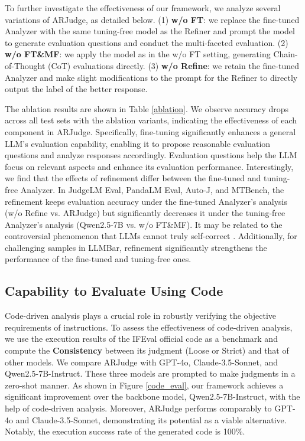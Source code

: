 To further investigate the effectiveness of our framework, we analyze several variations of ARJudge, as detailed below. 
(1) \textbf{w/o FT}: we replace the fine-tuned Analyzer with the same tuning-free model as the Refiner and prompt the model to generate evaluation questions and conduct the multi-faceted evaluation. 
(2) \textbf{w/o FT\&MF}: we apply the model as in the w/o FT setting, generating Chain-of-Thought (CoT) evaluations directly. 
(3) \textbf{w/o Refine}: we retain the fine-tuned Analyzer and make slight modifications to the prompt for the Refiner to directly output the label of the better response. 

The ablation results are shown in Table \ref{ablation}. We observe accuracy drops across all test sets with the ablation variants, indicating the effectiveness of each component in ARJudge. Specifically, fine-tuning significantly enhances a general LLM’s evaluation capability, enabling it to propose reasonable evaluation questions and analyze responses accordingly. Evaluation questions help the LLM focus on relevant aspects and enhance its evaluation performance. Interestingly, we find that the effects of refinement differ between the fine-tuned and tuning-free Analyzer. In JudgeLM Eval, PandaLM Eval, Auto-J, and MTBench, the refinement keeps evaluation accuracy under the fine-tuned Analyzer’s analysis (w/o Refine vs. ARJudge) but significantly decreases it under the tuning-free Analyzer’s analysis (Qwen2.5-7B vs. w/o FT\&MF). It may be related to the controversial phenomenon that LLMs cannot truly self-correct \cite{self-correct}. Additionally, for challenging samples in LLMBar, refinement significantly strengthens the performance of the fine-tuned and tuning-free ones.

\subsection{Capability to Evaluate Using Code}

Code-driven analysis plays a crucial role in robustly verifying the objective requirements of instructions. To assess the effectiveness of code-driven analysis, we use the execution results of the IFEval official code as a benchmark and compute the \textbf{Consistency} between its judgment (Loose or Strict) and that of other models. We compare ARJudge with GPT-4o, Claude-3.5-Sonnet, and Qwen2.5-7B-Instruct. These three models are prompted to make judgments in a zero-shot manner. As shown in Figure \ref{code_eval}, our framework achieves a significant improvement over the backbone model, Qwen2.5-7B-Instruct, with the help of code-driven analysis. Moreover, ARJudge performs comparably to GPT-4o and Claude-3.5-Sonnet, demonstrating its potential as a viable alternative. Notably, the execution success rate of the generated code is 100\%. 

